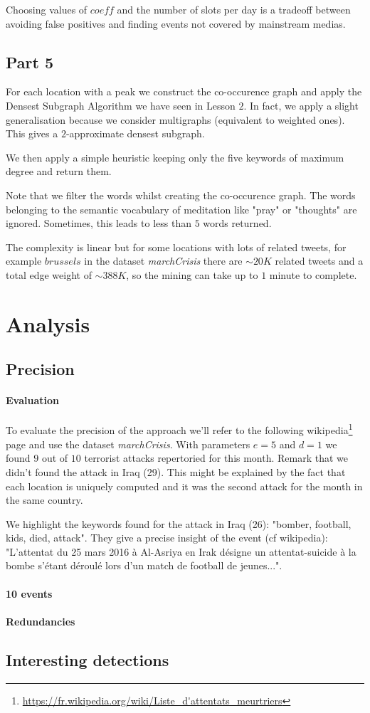 \documentclass[a4paper]{article}
\begin{document}
 Choosing values of $coeff$ and the number of slots per day is a tradeoff between avoiding false positives and finding events not covered by mainstream medias.
 
\subsection{Part 5}

For each location with a peak we construct the co-occurence graph and apply the Densest Subgraph Algorithm we have seen in Lesson $2$. In fact, we apply a slight generalisation because we consider multigraphs (equivalent to weighted ones). This gives a $2$-approximate densest subgraph.

We then apply a simple heuristic keeping only the five keywords of maximum degree and return them.

Note that we filter the words whilst creating the co-occurence graph. The words belonging to the semantic vocabulary of meditation like "pray" or "thoughts" are ignored. Sometimes, this leads to less than $5$ words returned.

The complexity is linear but for some locations with lots of related tweets, for example $brussels$ in the dataset \textit{marchCrisis} there are $\sim 20K$ related tweets and a total edge weight of $\sim 388K$, so the mining can take up to $1$ minute to complete.

\section{Analysis}
\subsection{Precision}
\paragraph{Evaluation}
To evaluate the precision of the approach we'll refer to the following wikipedia\footnote{\url{https://fr.wikipedia.org/wiki/Liste_d'attentats_meurtriers}} page and use the dataset \textit{marchCrisis}. 
With parameters $e=5$ and $d=1$ we found $9$ out of $10$ terrorist attacks repertoried for this month. Remark that we didn't found the attack in Iraq (29). This might be explained by the fact that each location is uniquely computed and it was the second attack for the month in the same country.

We highlight the keywords found for the attack in Iraq (26): "bomber, football, kids, died, attack". They give a precise insight of the event (cf wikipedia): "L'attentat du 25 mars 2016 à Al-Asriya en Irak désigne un attentat-suicide à la bombe s'étant déroulé lors d'un match de football de jeunes...".

\paragraph{10 events}


\paragraph{Redundancies}
\subsection{Interesting detections}
\end{document}
